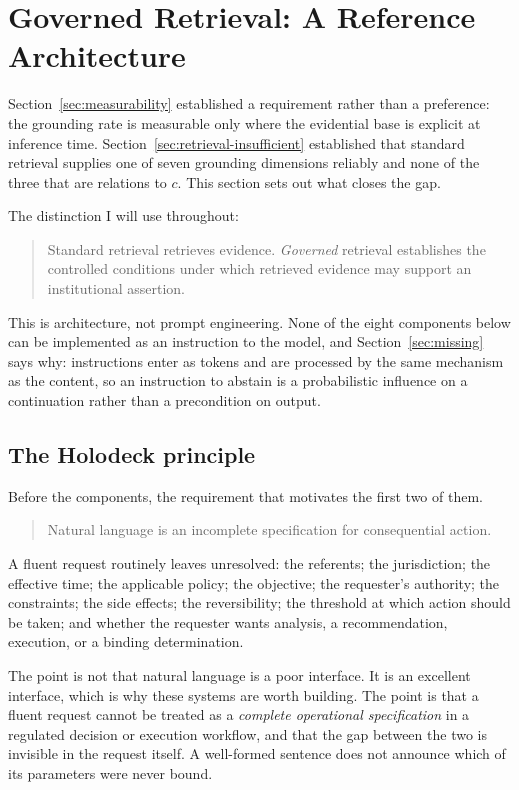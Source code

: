 \documentclass[11pt]{article}
\theoremstyle{plain}
\theoremstyle{definition}
\begin{document}
\section{Governed Retrieval: A Reference Architecture}
\label{sec:governed-rag}

Section~\ref{sec:measurability} established a requirement rather than a preference:
the grounding rate is measurable only where the evidential base is explicit at
inference time. Section~\ref{sec:retrieval-insufficient} established that standard
retrieval supplies one of seven grounding dimensions reliably and none of the three
that are relations to $c$. This section sets out what closes the gap.

The distinction I will use throughout:

\begin{quote}
Standard retrieval retrieves evidence. \emph{Governed} retrieval establishes the
controlled conditions under which retrieved evidence may support an institutional
assertion.
\end{quote}

This is architecture, not prompt engineering. None of the eight components below can
be implemented as an instruction to the model, and Section~\ref{sec:missing} says
why: instructions enter as tokens and are processed by the same mechanism as the
content, so an instruction to abstain is a probabilistic influence on a
continuation rather than a precondition on output.

\subsection{The Holodeck principle}
\label{sec:holodeck}

Before the components, the requirement that motivates the first two of them.

\begin{quote}
Natural language is an incomplete specification for consequential action.
\end{quote}

A fluent request routinely leaves unresolved: the referents; the jurisdiction; the
effective time; the applicable policy; the objective; the requester's authority; the
constraints; the side effects; the reversibility; the threshold at which action
should be taken; and whether the requester wants analysis, a recommendation,
execution, or a binding determination.

The point is not that natural language is a poor interface. It is an excellent
interface, which is why these systems are worth building. The point is that a
fluent request cannot be treated as a \emph{complete operational specification} in a
regulated decision or execution workflow, and that the gap between the two is
invisible in the request itself. A well-formed sentence does not announce which of
its parameters were never bound.
\end{document}
